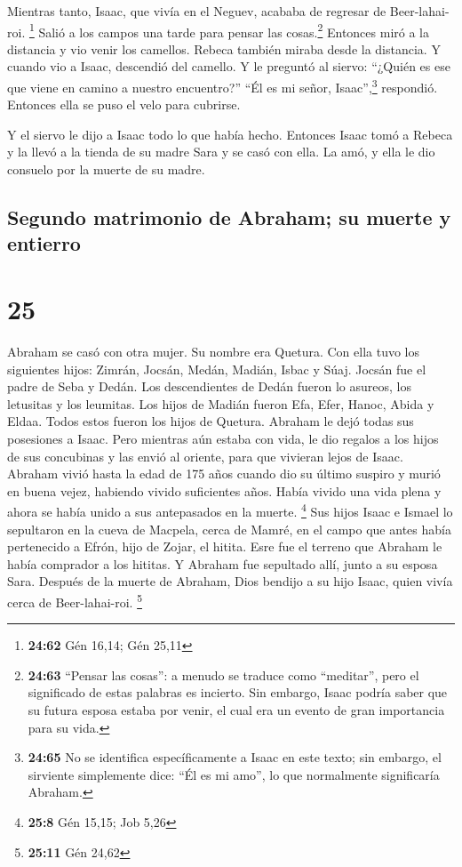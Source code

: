  Mientras tanto, Isaac, que vivía en el Neguev, acababa
de regresar de Beer-lahai-roi. \footnote{\textbf{24:62} Gén 16,14; Gén
  25,11}  Salió a los campos una tarde para pensar las
cosas.\footnote{\textbf{24:63} ``Pensar las cosas'': a menudo se traduce
  como ``meditar'', pero el significado de estas palabras es incierto.
  Sin embargo, Isaac podría saber que su futura esposa estaba por venir,
  el cual era un evento de gran importancia para su vida.} Entonces miró
a la distancia y vio venir los camellos.  Rebeca también
miraba desde la distancia. Y cuando vio a Isaac, descendió del camello.
 Y le preguntó al siervo: ``¿Quién es ese que viene en
camino a nuestro encuentro?'' ``Él es mi señor, Isaac'',\footnote{\textbf{24:65}
  No se identifica específicamente a Isaac en este texto; sin embargo,
  el sirviente simplemente dice: ``Él es mi amo'', lo que normalmente
  significaría Abraham.} respondió. Entonces ella se puso el velo para
cubrirse.

 Y el siervo le dijo a Isaac todo lo que había hecho.
 Entonces Isaac tomó a Rebeca y la llevó a la tienda de
su madre Sara y se casó con ella. La amó, y ella le dio consuelo por la
muerte de su madre.

\hypertarget{segundo-matrimonio-de-abraham-su-muerte-y-entierro}{%
\subsection{Segundo matrimonio de Abraham; su muerte y
entierro}\label{segundo-matrimonio-de-abraham-su-muerte-y-entierro}}

\hypertarget{section-24}{%
\section{25}\label{section-24}}

 Abraham se casó con otra mujer. Su nombre era Quetura.
 Con ella tuvo los siguientes hijos: Zimrán, Jocsán,
Medán, Madián, Isbac y Súaj.  Jocsán fue el padre de Seba
y Dedán. Los descendientes de Dedán fueron lo asureos, los letusitas y
los leumitas.  Los hijos de Madián fueron Efa, Efer,
Hanoc, Abida y Eldaa. Todos estos fueron los hijos de Quetura.
 Abraham le dejó todas sus posesiones a Isaac.
 Pero mientras aún estaba con vida, le dio regalos a los
hijos de sus concubinas y las envió al oriente, para que vivieran lejos
de Isaac.  Abraham vivió hasta la edad de 175 años
 cuando dio su último suspiro y murió en buena vejez,
habiendo vivido suficientes años. Había vivido una vida plena y ahora se
había unido a sus antepasados en la muerte. \footnote{\textbf{25:8} Gén
  15,15; Job 5,26}  Sus hijos Isaac e Ismael lo sepultaron
en la cueva de Macpela, cerca de Mamré, en el campo que antes había
pertenecido a Efrón, hijo de Zojar, el hitita.  Esre fue
el terreno que Abraham le había comprador a los hititas. Y Abraham fue
sepultado allí, junto a su esposa Sara.  Después de la
muerte de Abraham, Dios bendijo a su hijo Isaac, quien vivía cerca de
Beer-lahai-roi. \footnote{\textbf{25:11} Gén 24,62}

